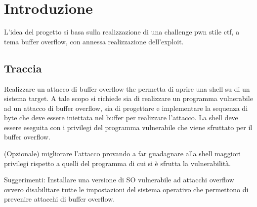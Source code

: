 \documentclass[main.tex]{subfiles}
\begin{document}
\section{Introduzione}\label{sec:introduzione}

\hspace*{0.25in}L'idea del progetto si basa sulla realizzazione di una challenge pwn stile ctf, a tema buffer overflow, con annessa realizzazione dell'exploit.

\subsection{Traccia}
Realizzare un attacco di buffer overflow the permetta di aprire una shell su di un sistema target. A tale scopo si richiede sia di realizzare un programma vulnerabile ad un attacco di buffer overflow, sia di progettare e implementare la sequenza di byte che deve essere iniettata nel buffer per realizzare l’attacco. La shell deve essere eseguita con i privilegi del programma vulnerabile che viene sfruttato per il buffer overflow. 

(Opzionale) migliorare l’attacco provando a far guadagnare alla shell maggiori privilegi rispetto a quelli del programma di cui si è sfrutta la vulnerabilità.

Suggerimenti: Installare una versione di SO vulnerabile ad attacchi overflow ovvero disabilitare tutte le impostazioni del sistema operativo che permettono di prevenire attacchi di buffer overflow.
\end{document}

